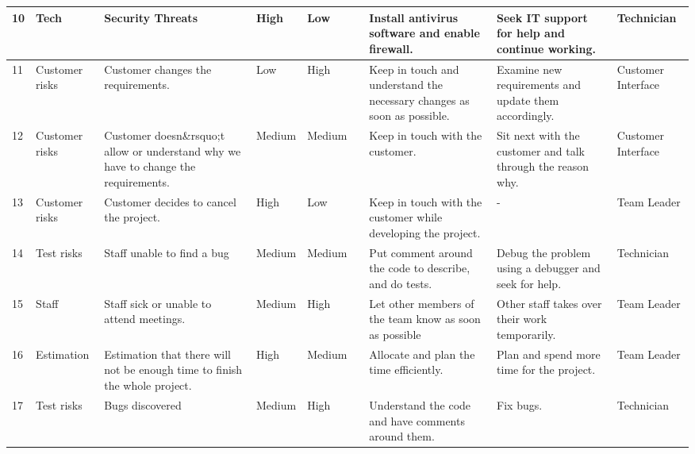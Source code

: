 \begin{longtable}{|l|p{2cm}|p{3cm}|l|l|l|p{4cm}|p{4cm}|p{3cm}|}
	10 & Tech & Security Threats & High & Low & \medium & Install antivirus software and enable firewall. & Seek IT support for help and continue working. & Technician \\ \hline
	11 & Customer risks & Customer changes the requirements. & Low & High & \medium & Keep in touch and understand the necessary changes as soon as possible. & Examine new requirements and update them accordingly. & Customer Interface \\ \hline
	12 & Customer risks & Customer doesn\&rsquo;t allow or understand why we have to change the requirements. & Medium & Medium & \medium & Keep in touch with the customer. & Sit next with the customer and talk through the reason why. & Customer Interface \\ \hline
	13 & Customer risks & Customer decides to cancel the project. & High & Low & \medium & Keep in touch with the customer while developing the project. & - & Team Leader \\ \hline
	14 & Test risks & Staff unable to find a bug & Medium & Medium & \medium & Put comment around the code to describe, and do tests. & Debug the problem using a debugger and seek for help. & Technician \\ \hline
	15 & Staff & Staff sick or unable to attend meetings. & Medium & High & \high & Let other members of the team know as soon as possible & Other staff takes over their work temporarily. & Team Leader \\ \hline
	16 & Estimation & Estimation that there will not be enough time to finish the whole project. & High & Medium & \high & Allocate and plan the time efficiently. & Plan and spend more time for the project. & Team Leader \\ \hline
	17 & Test risks & Bugs discovered & Medium & High & \high & Understand the code and have comments around them. & Fix bugs. & Technician \\ \hline
	
\end{longtable}